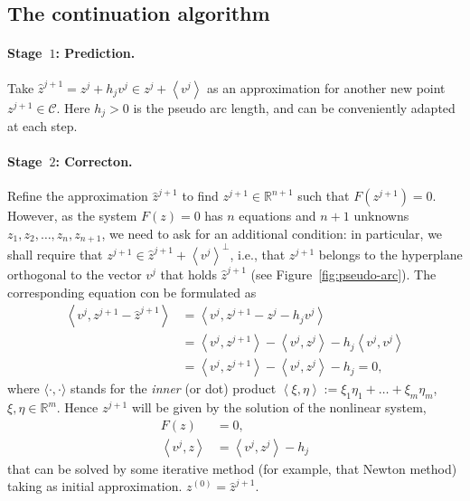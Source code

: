 \documentclass[11pt,reqno,twoside]{article}
\newcommand{\R}{\ensuremath{\mathbb{R}}}
\theoremstyle{remark}
\begin{document}
\subsection*{The continuation algorithm}
  \paragraph{Stage~$1$: Prediction.}
    Take $\hat{z}^{j+1} = z^{j} + h_{j}
    v^{j}\in z^{j} + \left\langle v^{j}\right\rangle$ as an approximation
    for another new point $z^{j+1}\in\mathcal{C}$. Here $h_{j} > 0$ is the
    pseudo arc length, and can be conveniently adapted at each step.
  \paragraph{Stage~$2$: Correcton.}
 Refine the approximation $\hat{z}^{j+1}$ to
    find $z^{j+1}\in\R^{n+1}$ such that $F\left(z^{j+1}\right) = 0$.
    However, as the system $F(z) = 0$ has $n$ equations and $n+1$ unknowns
    $z_{1}, z_{2},\dots,z_{n},z_{n+1}$, we need to ask for an additional
    condition: in particular, we shall require that
    $z^{j+1}\in\hat{z}^{j+1} +\left\langle v^{j}\right\rangle^{\perp}$, i.e., that
    $z^{j+1}$ belongs to
    the hyperplane orthogonal to the vector $v^{j}$ that holds
    $\hat{z}^{j+1}$
    (see Figure~\ref{fig:pseudo-arc}). The
    corresponding equation con be formulated as
    \begin{align*}
      \left\langle v^{j}, z^{j+1} - \hat{z}^{j+1}\right\rangle &=
      \left\langle v^{j}, z^{j+1} - z^{j} - h_{j} v^{j}\right\rangle \\
      &= \left\langle v^{j}, z^{j+1}\right\rangle -
        \left\langle v^{j}, z^{j}\right\rangle -
        h_{j} \left\langle v^{j}, v^{j}\right\rangle\\
      &=  \left\langle v^{j}, z^{j+1}\right\rangle -
          \left\langle v^{j}, z^{j}\right\rangle - h_{j} = 0,
    \end{align*}
    where $\langle\cdot, \cdot\rangle$ stands for the \emph{inner} (or dot)
    product $\left\langle\xi, \eta\right\rangle := \xi_{1}\eta_{1} + \dots +
    \xi_{m}\eta_{m}$, $\xi, \eta\in\R^{m}$. Hence $z^{j+1}$ will be
    given by the solution of the nonlinear system,
    \begin{equation}
      \begin{split}\label{eq:enlarged-nl-system-corrector}
        F(z) &= 0,\\
        \left\langle v^{j}, z\right\rangle &= \left\langle v^{j},
        z^{j}\right\rangle - h_{j}
        \end{split}
    \end{equation}
    that can be solved by some iterative method (for example, that Newton
    method) taking as initial approximation. $z^{(0)} = \hat{z}^{j+1}$.
\end{document}
